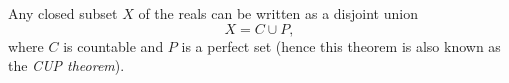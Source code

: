 \documentclass[12pt]{article}
\begin{document}
Any closed subset $X$ of the reals can be written as a disjoint union
\[
  X = C \cup P,
\]
where $C$ is countable and $P$ is a perfect set (hence this theorem is also known as the \emph{CUP theorem}).
\end{document}
